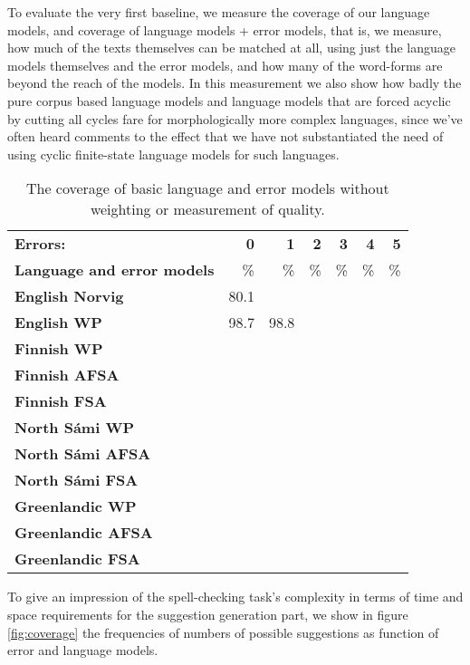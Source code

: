 \documentclass[a4paper,12pt]{article}
\begin{document}
To evaluate the very first baseline, we measure the coverage of our language
models, and coverage of language models + error models, that is, we measure,
how much of the texts themselves can be matched at all, using just the language
models themselves and the error models, and how many of the word-forms are
beyond the reach of the models. In this measurement we also show how badly the
pure corpus based language models and language models that are forced acyclic
by cutting all cycles fare for morphologically more complex languages, since
we've often heard comments to the effect that we have not substantiated the
need of using cyclic finite-state language models for such languages.

\begin{table}
    \centering
    \begin{tabular}{|l|r|r|r|r|r|r|}
        \hline
        \bf Errors: & \bf 0  & \bf 1 & \bf 2 & \bf 3 & \bf 4 & \bf 5 \\
        \bf Language and error models &  \% & \% & \% & \% & \% & \% \\
        \hline
        \bf English Norvig & 80.1 & & & & & \\
            \bf English WP & 98.7 & 98.8 & & & & \\
        \hline
                   \bf Finnish WP & & & & & & \\
                  \bf Finnish AFSA & & & & & & \\
                  \bf Finnish FSA & & & & & & \\
        \hline
        \bf North Sámi WP & & & & & & \\
               \bf North Sámi AFSA & & & & & & \\
               \bf North Sámi FSA & & & & & & \\
        \hline
        \bf Greenlandic WP & & & & & & \\
                 \bf Greenlandic AFSA & & & & & & \\
                  \bf Greenlandic FSA & & & & & & \\
        \hline
    \end{tabular}
    \caption{The coverage of basic language and error models without weighting
        or measurement of quality.\label{table:baseline-coverage}}
\end{table}

To give an impression of the spell-checking task's complexity in terms of time
and space requirements for the suggestion generation part, we show in figure
\ref{fig:coverage} the frequencies of numbers of possible suggestions as function of error
and language models.
\end{document}
